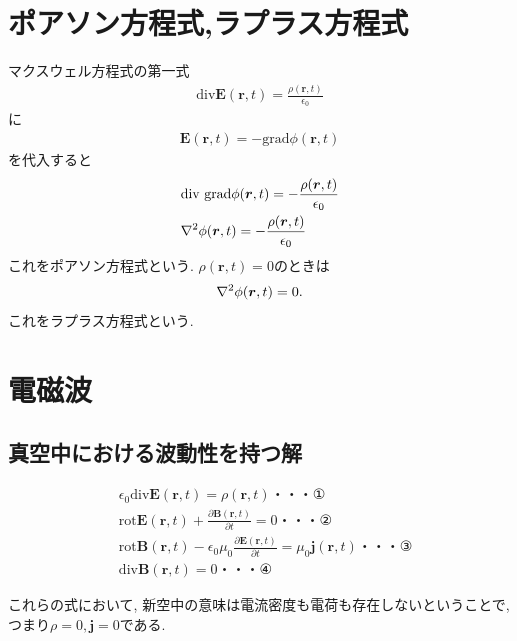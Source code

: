 \documentclass[a4paper,12pt]{jlreq}
\begin{document}
\newpage

\section*{ポアソン方程式,ラプラス方程式}

マクスウェル方程式の第一式
\begin{align}
  \text{div} \bm{E}(\bm{r},t) = \frac{\rho(\bm{r},t)}{\epsilon_0}
\end{align}
に
\begin{align}
  \bm{E}(\bm{r},t) = -\text{grad}\phi(\bm{r},t) 
\end{align}
を代入すると
\begin{align}
  &\text{div grad} \phi(\bm{r},t) = -\frac{\rho(\bm{r},t)}{\epsilon_0}\\
  &\laplacian{\phi(\bm{r},t)} = -\frac{\rho(\bm{r},t)}{\epsilon_0}
\end{align}
これをポアソン方程式という.
$\rho(\bm{r},t) = 0$のときは
\begin{align}
  \laplacian{\phi(\bm{r},t)} = 0.
\end{align}
これをラプラス方程式という. 



\newpage
\section*{電磁波}

\subsection*{真空中における波動性を持つ解}

\begin{align}
  &\epsilon_0 \text{div}\bm{E}(\bm{r},t) = \rho(\bm{r},t)　・・・①\\
  &\text{rot} \bm{E}(\bm{r},t) + \frac{\partial \bm{B}(\bm{r},t)}{\partial t} = 0　・・・②\\
  &\text{rot} \bm{B}(\bm{r},t) - \epsilon_0 \mu_0 \frac{\partial \bm{E}(\bm{r},t)}{\partial t} = \mu_0 \bm{j}(\bm{r},t)　・・・③\\
  &\text{div} \bm{B}(\bm{r},t) = 0　・・・④
\end{align}

これらの式において, 新空中の意味は電流密度も電荷も存在しないということで, 
つまり$\rho = 0, \bm{j} = 0$である. \par
\end{document}
